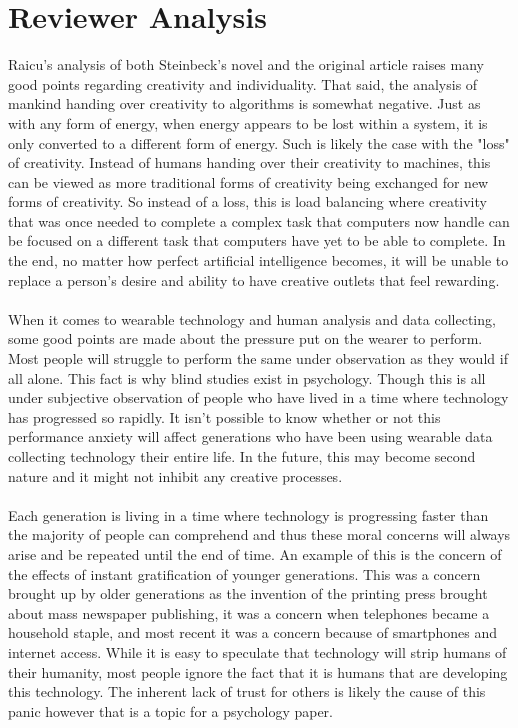 \documentclass[notitlepage,a4paper,12pt]{article}
\begin{document}
\section*{Reviewer Analysis}
Raicu's analysis of both Steinbeck's novel and the original article raises many good points regarding creativity and individuality. That said, the analysis of mankind handing over creativity to algorithms is somewhat negative. Just as with any form of energy, when energy appears to be lost within a system, it is only converted to a different form of energy. Such is likely the case with the "loss" of creativity. Instead of humans handing over their creativity to machines, this can be viewed as more traditional forms of creativity being exchanged for new forms of creativity. So instead of a loss, this is load balancing where creativity that was once needed to complete a complex task that computers now handle can be focused on a different task that computers have yet to be able to complete. In the end, no matter how perfect artificial intelligence becomes, it will be unable to replace a person's desire and ability to have creative outlets that feel rewarding.\\
{}\\
When it comes to wearable technology and human analysis and data collecting, some good points are made about the pressure put on the wearer to perform. Most people will struggle to perform the same under observation as they would if all alone. This fact is why blind studies exist in psychology. Though this is all under subjective observation of people who have lived in a time where technology has progressed so rapidly. It isn't possible to know whether or not this performance anxiety will affect generations who have been using wearable data collecting technology their entire life. In the future, this may become second nature and it might not inhibit any creative processes.\\
{}\\
Each generation is living in a time where technology is progressing faster than the majority of people can comprehend and thus these moral concerns will always arise and be repeated until the end of time. An example of this is the concern of the effects of instant gratification of younger generations. This was a concern brought up by older generations as the invention of the printing press brought about mass newspaper publishing, it was a concern when telephones became a household staple, and most recent it was a concern because of smartphones and internet access. While it is easy to speculate that technology will strip humans of their humanity, most people ignore the fact that it is humans that are developing this technology. The inherent lack of trust for others is likely the cause of this panic however that is a topic for a psychology paper.
\end{document}
